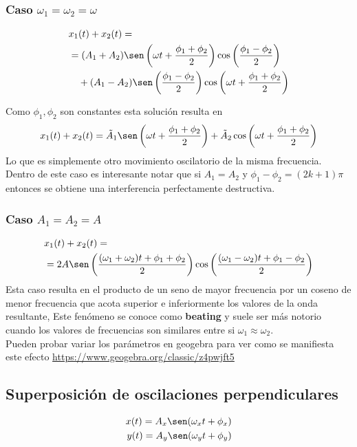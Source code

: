 \documentclass[12pt]{article}
\begin{document}
\subsubsection*{Caso \(\omega_1 = \omega_2 = \omega\) }
\begin{align*}
    &x_1(t) + x_2(t) =\\
    &=(A_1 + A_2)\sen\left( \omega t +\frac{ \phi_1 + \phi_2}{2}\right)\cos\left(\frac{ \phi_1 - \phi_2}{2}\right)\\
     & \quad +(A_1 - A_2)\sen\left(\frac{ \phi_1 - \phi_2}{2}\right)\cos\left(\omega t +\frac{ \phi_1 + \phi_2}{2}\right)
\end{align*}

Como \(\phi_1,\phi_2\) son constantes esta solución resulta en
\begin{align*}
    x_1(t) + x_2(t) = \tilde{A}_1\sen\left( \omega t +\frac{ \phi_1 + \phi_2}{2}\right) + \tilde{A}_2\cos\left(\omega t +\frac{ \phi_1 + \phi_2}{2}\right)
\end{align*}
Lo que es simplemente otro movimiento oscilatorio de la misma frecuencia.\\

Dentro de este caso es interesante notar que si \(A_1 = A_2\) y \(\phi_1 - \phi_2 =(2k+1)\pi\) entonces se obtiene una interferencia perfectamente destructiva.

\subsubsection*{Caso \(A_1 = A_2 = A\)}

\begin{align*}
    &x_1(t) + x_2(t) =\\
    &= 2A \sen\left(\frac{(\omega_1 + \omega_2)t + \phi_1 + \phi_2}{2}\right)\cos\left(\frac{(\omega_1 - \omega_2)t + \phi_1 - \phi_2}{2}\right)\\
\end{align*}
Esta caso resulta en el producto de un seno de mayor frecuencia por un coseno de menor frecuencia que acota superior e inferiormente los valores de la onda resultante, Este fenómeno se conoce como \textbf{beating} y suele ser más notorio cuando los valores de frecuencias son similares entre si \(\omega_1 \approx \omega_2\).\\

Pueden probar variar los parámetros en geogebra para ver como se manifiesta este efecto \url{https://www.geogebra.org/classic/z4pwjft5}

\subsection{Superposición de oscilaciones perpendiculares}
\begin{align*}
    x(t) = A_x\sen(\omega_x t + \phi_x) \\
    y(t) = A_y\sen(\omega_y t + \phi_y)
\end{align*}
\end{document}
